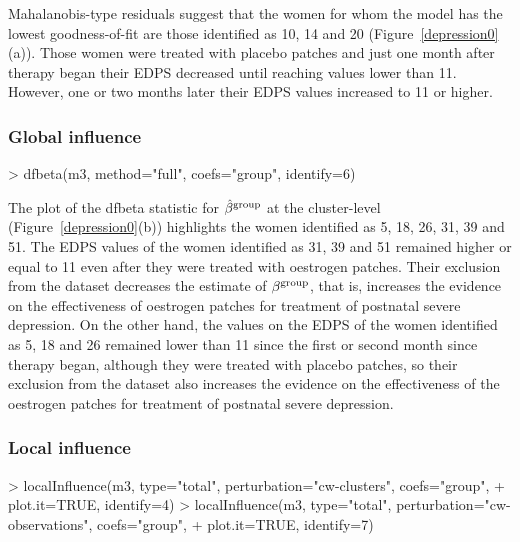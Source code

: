 Mahalanobis-type residuals suggest that the women for whom the model has the lowest goodness-of-fit are those identified as 10, 14 and 20 (Figure~\ref{depression0}(a)). Those women were treated with placebo patches and just one month after therapy began their EDPS decreased until reaching values lower than 11. However, one or two months later their EDPS values increased to 11 or higher.

\subsubsection{Global influence}
\begin{example}
> dfbeta(m3, method="full", coefs="group", identify=6)
\end{example}

The plot of the dfbeta statistic for $\hat{\beta}^{\rm group}$ at the cluster-level (Figure~\ref{depression0}(b)) highlights the women identified as 5, 18, 26, 31, 39 and 51. The EDPS values of the women identified as 31, 39 and 51 remained higher or equal to 11 even after they were treated with oestrogen patches. Their exclusion from the dataset decreases the estimate of $\beta^{\rm group}$, that is, increases the evidence on the effectiveness of oestrogen patches for treatment of postnatal severe depression. On the other hand, the values on the EDPS of the women identified as 5, 18 and 26 remained lower than 11 since the first or second month since therapy began, although they were treated with placebo patches, so their exclusion from the dataset also increases the evidence on the effectiveness of the oestrogen patches for treatment of postnatal severe depression.

\subsubsection{Local influence}
\begin{example}
> localInfluence(m3, type="total", perturbation="cw-clusters", coefs="group", 
+                plot.it=TRUE, identify=4)
> localInfluence(m3, type="total", perturbation="cw-observations", coefs="group", 
+                plot.it=TRUE, identify=7)
\end{example}

